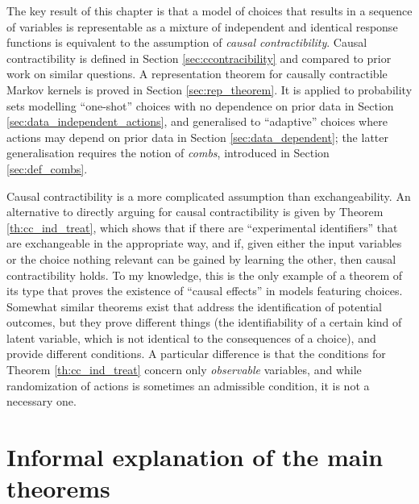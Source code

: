 The key result of this chapter is that a model of choices that results in a sequence of variables is representable as a mixture of independent and identical response functions is equivalent to the assumption of \emph{causal contractibility}. Causal contractibility is defined in Section \ref{sec:ccontracibility} and compared to prior work on similar questions. A representation theorem for causally contractible Markov kernels is proved in Section \ref{sec:rep_theorem}. It is applied to probability sets modelling ``one-shot'' choices with no dependence on prior data in Section \ref{sec:data_independent_actions}, and generalised to ``adaptive'' choices where actions may depend on prior data in Section \ref{sec:data_dependent}; the latter generalisation requires the notion of \emph{combs}, introduced in Section \ref{sec:def_combs}.

Causal contractibility is a more complicated assumption than exchangeability. An alternative to directly arguing for causal contractibility is given by Theorem \ref{th:cc_ind_treat}, which shows that if there are ``experimental identifiers'' that are exchangeable in the appropriate way, and if, given either the input variables or the choice nothing relevant can be gained by learning the other, then causal contractibility holds.  To my knowledge, this is the only example of a theorem of its type that proves the existence of ``causal effects'' in models featuring choices. Somewhat similar theorems exist that address the identification of potential outcomes, but they prove different things (the identifiability of a certain kind of latent variable, which is not identical to the consequences of a choice), and provide different conditions. A particular difference is that the conditions for Theorem \ref{th:cc_ind_treat} concern only \emph{observable} variables, and while randomization of actions is sometimes an admissible condition, it is not a necessary one.

\section{Informal explanation of the main theorems}


